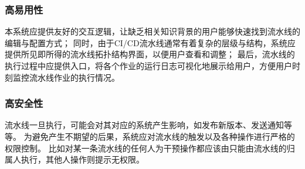 \subsubsection{高易用性}
本系统应提供友好的交互逻辑，让缺乏相关知识背景的用户能够快速找到流水线的编辑与配置方式；
同时，由于CI/CD流水线通常有着复杂的层级与结构，系统应提供所见即所得的流水线拓扑结构界面，以便用户查看和调整；
最后，流水线的执行过程中应提供入口，将各个作业的运行日志可视化地展示给用户，方便用户时刻监控流水线作业的执行情况。

\subsubsection{高安全性}
流水线一旦执行，可能会对其对应的系统产生影响，如发布新版本、发送通知等等。
为避免产生不期望的后果，系统应对流水线的触发以及各种操作进行严格的权限控制。
比如对某一条流水线的任何人为干预操作都应该由只能由流水线的归属人执行，其他人操作则提示无权限。
